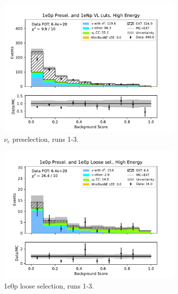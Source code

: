 \begin{figure}[H]
    \centering
    \begin{subfigure}{0.5\linewidth}
    \includegraphics[width=\linewidth]{technote/Sidebands/Figures/FarSideband/far_sideband_bkg_score_run123_ZP_ZP_HIGH_ENERGY.pdf}
    \caption{$\nu_e$ preselection, runs 1-3.}
    \end{subfigure}%
    \begin{subfigure}{0.5\linewidth}
    \includegraphics[width=\linewidth]{technote/Sidebands/Figures/FarSideband/far_sideband_bkg_score_run123_ZP_ZPLOOSESEL_HIGH_ENERGY.pdf}
    \caption{1e0p loose selection, runs 1-3.}
    \end{subfigure}
    \begin{subfigure}{0.5\linewidth}

\end{subfigure}
\end{figure}
